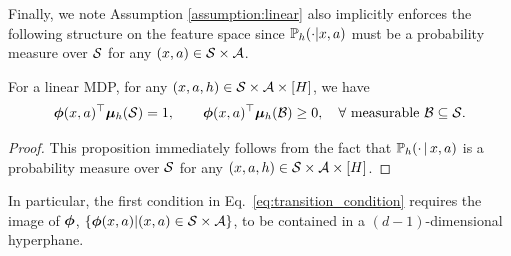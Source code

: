 Finally, we note Assumption \ref{assumption:linear} also implicitly enforces the following structure on the feature space since $\P_h(\cdot|x, a)$ must be a probability measure over $\cS$ for any $(x, a) \in \cS \times \cA$.

\begin{proposition}\label{prop:linear_structure}
For a linear MDP,  for any $(x, a, h) \in \cS\times \cA \times [H] $, we have 
\begin{align} \label{eq:transition_condition}
\bphi(x,a) \trans \bmu_h(\cS) =  1, \qquad   
\bphi(x,a) \trans \bmu_h(\mathcal{B})\ge  0, \quad \forall \text{~measurable~} \mathcal{B} \subseteq \cS.
\end{align}
\end{proposition}

\begin{proof}
This proposition immediately follows from the fact that $\P_h (\cdot \given  x, a)$ is a    probability measure over $\cS$ for any $(x, a, h) \in \cS \times \cA \times [ H ] $.
\end{proof}

In particular, the first condition in Eq.~\eqref{eq:transition_condition} requires the image of $\bphi$, $\{ \bphi(x, a) | (x, a) \in \cS \times \cA \}$, to be contained in a $(d-1)$-dimensional hyperphane.



 







